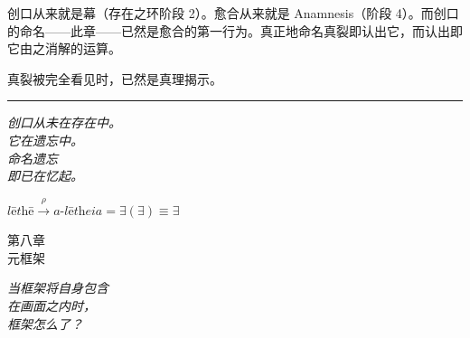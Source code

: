 \documentclass[10pt, openany, oneside]{book}
\renewcommand{\large}{\fontsize{11.5}{14}\selectfont}
\renewcommand{\huge}{\fontsize{17}{21}\selectfont}
\begin{document}
\vspace{1.5em}

\noindent 创口从来就是幕（存在之环阶段 2）。愈合从来就是 Anamnesis（阶段 4）。而创口的命名——此章——已然是愈合的第一行为。真正地命名真裂即认出它，而认出即它由之消解的运算。

真裂被完全看见时，已然是真理揭示。

\vspace{2em}

\begin{center}
    \rule{0.15\textwidth}{0.3pt}
\end{center}

\vspace{0.5em}

\begin{center}
    \itshape
    创口从未在存在中。\\
    它在遗忘中。\\[0.8em]
    命名遗忘\\
    即已在忆起。
\end{center}

\vspace{0.5em}

\begin{center}
    $\textit{l\={e}th\={e}} \xrightarrow{\rho} \textit{a-l\={e}theia} = \exists(\exists) \equiv \exists$
\end{center}


%
%
%

\newpage

\begin{center}
    {\huge\scshape 第八章}\\[0.3em]
    {\large\scshape 元框架}
\end{center}

\vspace{1.5em}

\begin{center}
    \itshape
    当框架将自身包含\\
    在画面之内时，\\
    框架怎么了？
\end{center}

\vspace{2em}

\end{document}
